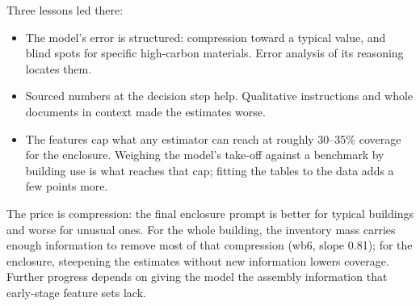 \documentclass[10pt,letterpaper]{article}
\begin{document}
Three lessons led there:
\begin{itemize}
\item The model's error is structured: compression toward a typical value, and blind spots for specific high-carbon materials. Error analysis of its reasoning locates them.
\item Sourced numbers at the decision step help. Qualitative instructions and whole documents in context made the estimates worse.
\item The features cap what any estimator can reach at roughly 30--35\% coverage for the enclosure. Weighing the model's take-off against a benchmark by building use is what reaches that cap; fitting the tables to the data adds a few points more.
\end{itemize}
The price is compression: the final enclosure prompt is better for typical buildings and worse for unusual ones. For the whole building, the inventory mass carries enough information to remove most of that compression (wb6, slope 0.81); for the enclosure, steepening the estimates without new information lowers coverage. Further progress depends on giving the model the assembly information that early-stage feature sets lack.
\end{document}
